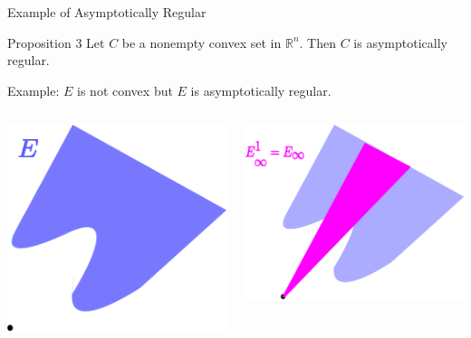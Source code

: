 \documentclass[aspectratio=169, dvipdfmx, 11pt]{beamer} %
\newcommand{\NDemenstionalRealEuclideanSpace}{\mathbb{R}^n}
\begin{document}
\begin{frame}{Example of Asymptotically Regular}
    \begin{block}{Proposition 3}
        Let $C$ be a nonempty convex set in $\NDemenstionalRealEuclideanSpace$. Then $C$ is asymptotically regular.
    \end{block}

    Example: $E$ is not convex but $E$ is asymptotically regular.

    \medskip

    \centering
    \begin{columns}
        \begin{column}{0.48\textwidth}
        \centering
        \includegraphics[keepaspectratio, scale=0.095]{figures/example_not_convex_asymptotically_regular_1.eps}
        \end{column}
        \pause
        \begin{column}{0.48\textwidth}
        \centering
        \includegraphics[keepaspectratio, scale=0.095]{figures/example_not_convex_asymptotically_regular_2.eps}

\end{column}
\end{columns}
\end{frame}
\end{document}

